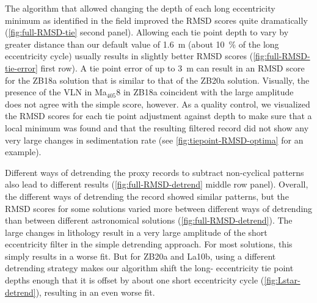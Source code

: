 \documentclass[draft]{agujournal2019}
\newcommand{\ma}[1]{Ma\(_{405}\)#1} %
\newcommand{\rez}{\textcolor{magenta}}
\newcommand{\ijk}{\textcolor{blue}}
\begin{document}
The algorithm that allowed changing the depth of each long eccentricity minimum as identified in the field improved the \gls{RMSD} scores quite dramatically (\cref{fig:full-RMSD-tie} second panel).
Allowing each tie point depth to vary by greater distance than our default value of \qty{1.6}{\metre} (about \qty{10}{\percent} of the long eccentricity cycle) usually results in slightly better \gls{RMSD} scores (\cref{fig:full-RMSD-tie-error} first row).
A tie point error of up to \qty{3}{\metre} can result in an \gls{RMSD} score for the ZB18a solution that is similar to that of the ZB20a solution.
Visually, the presence of the \gls{VLN} in \ma{8} in ZB18a coincident with the large amplitude does not agree with the simple score, however.
As a quality control, we visualized the \gls{RMSD} scores for each tie point adjustment against depth to make sure that a local minimum was found and that the resulting filtered record did not show any very large changes in sedimentation rate (see \cref{fig:tiepoint-RMSD-optima} for an example).

Different ways of detrending the proxy records to subtract non-cyclical patterns also lead to different results (\cref{fig:full-RMSD-detrend} middle row panel).
Overall, the different ways of detrending the record showed similar patterns, but the \gls{RMSD} scores for some solutions varied more between different ways of detrending than between different astronomical solutions (\cref{fig:full-RMSD-detrend}).
The large changes in lithology result in a very large amplitude of the short eccentricity filter in the simple detrending approach.
For most solutions, this simply results in a worse fit.
But for ZB20a and La10b, using a different detrending strategy makes our algorithm shift the long- eccentricity tie point depths enough that it is offset by about one short eccentricity cycle (\cref{fig:Lstar-detrend}), resulting in an even worse fit.
\end{document}
